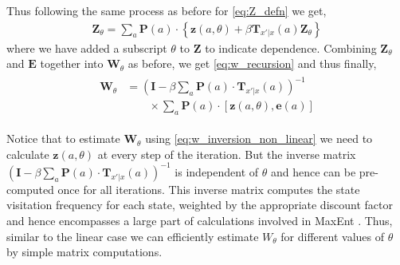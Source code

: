 \documentclass{article}
\newcommand{\overbar}[1]{\mkern 1.5mu\overline{\mkern-1.5mu#1\mkern-1.5mu}\mkern 1.5mu}
\begin{document}
%
Thus following the same process as before for \eqref{eq:Z_defn} we get, 
\begin{align}\label{eq:Z_defn_non_linear}
\mathbf{Z}_{\theta} = \sum_{a}\mathbf{P}(a) \cdot \left\{ \mathbf{z}(a, \theta) + \beta \mathbf{T}_{x'|x}(a)\mathbf{Z}_{\theta}\right\}
\end{align}
where we have added a subscript $\theta$ to $\mathbf{Z}$ to indicate dependence. Combining $\mathbf{Z}_{\theta}$ and $\mathbf{E}$ together into $\mathbf{W}_{\theta}$ as before, we get \eqref{eq:w_recursion} and thus finally,
\begin{align}\label{eq:w_inversion_non_linear}
\begin{split}
\mathbf{W}_{\theta} &= \left( \mathbf{I} - \beta \sum_{a}\mathbf{P}(a) \cdot \mathbf{T}_{x'|x}(a) \right)^{-1} \\
& \qquad \times \sum_{a}\mathbf{P}(a) \cdot [\mathbf{z}(a, \theta), \mathbf{e}(a)]
\end{split}
\end{align}

Notice that to estimate $\mathbf{W}_{\theta}$ using \eqref{eq:w_inversion_non_linear} we need to calculate $\mathbf{z}(a, \theta)$ at every step of the iteration. But the inverse matrix $\left( \mathbf{I} - \beta \sum_{a}\mathbf{P}(a) \cdot \mathbf{T}_{x'|x}(a) \right)^{-1}$ is independent of $\theta$ and hence can be pre-computed once for all iterations. This inverse matrix computes the state visitation frequency for each state, weighted by the appropriate discount factor and hence encompasses a large part of calculations involved in MaxEnt \cite{ziebart_phd}. 
Thus, similar to the linear case we can efficiently estimate $W_{\theta}$ for different values of $\theta$ by simple matrix computations.
\end{document}

